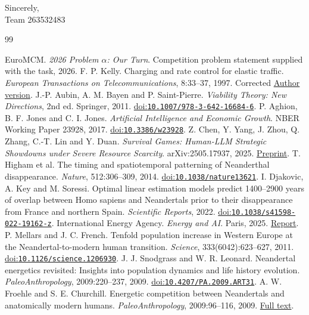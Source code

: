 \documentclass[12pt,a4paper]{article}
\theoremstyle{remark}
\newcommand{\TeamNumber}{263532483} %
\begin{document}
\medskip
Sincerely,\\
Team \TeamNumber

\clearpage
\begin{thebibliography}{99}
\setlength{\itemsep}{0pt}
\setlength{\parsep}{0pt}
\setlength{\parskip}{0pt}
 EuroMCM. \emph{2026 Problem $\alpha$: Our Turn}. Competition problem statement supplied with the task, 2026.
 F. P. Kelly. Charging and rate control for elastic traffic. \emph{European Transactions on Telecommunications}, 8:33--37, 1997. Corrected \href{https://www.statslab.cam.ac.uk/~fpk1/elastic.html}{Author version}.
 J.-P. Aubin, A. M. Bayen and P. Saint-Pierre. \emph{Viability Theory: New Directions}, 2nd ed. Springer, 2011. \href{https://doi.org/10.1007/978-3-642-16684-6}{doi:\nolinkurl{10.1007/978-3-642-16684-6}}.
 P. Aghion, B. F. Jones and C. I. Jones. \emph{Artificial Intelligence and Economic Growth}. NBER Working Paper 23928, 2017. \href{https://doi.org/10.3386/w23928}{doi:\nolinkurl{10.3386/w23928}}.
 Z. Chen, Y. Yang, J. Zhou, Q. Zhang, C.-T. Lin and Y. Duan. \emph{Survival Games: Human-LLM Strategic Showdowns under Severe Resource Scarcity}. arXiv:2505.17937, 2025. \href{https://arxiv.org/abs/2505.17937}{Preprint}.
 T. Higham et al. The timing and spatiotemporal patterning of Neanderthal disappearance. \emph{Nature}, 512:306--309, 2014. \href{https://doi.org/10.1038/nature13621}{doi:\nolinkurl{10.1038/nature13621}}.
 I. Djakovic, A. Key and M. Soressi. Optimal linear estimation models predict 1400--2900 years of overlap between Homo sapiens and Neandertals prior to their disappearance from France and northern Spain. \emph{Scientific Reports}, 2022. \href{https://doi.org/10.1038/s41598-022-19162-z}{doi:\nolinkurl{10.1038/s41598-022-19162-z}}.
 International Energy Agency. \emph{Energy and AI}. Paris, 2025. \href{https://www.iea.org/reports/energy-and-ai/energy-demand-from-ai}{Report}.
 P. Mellars and J. C. French. Tenfold population increase in Western Europe at the Neandertal-to-modern human transition. \emph{Science}, 333(6042):623--627, 2011. \href{https://doi.org/10.1126/science.1206930}{doi:\nolinkurl{10.1126/science.1206930}}.
 J. J. Snodgrass and W. R. Leonard. Neandertal energetics revisited: Insights into population dynamics and life history evolution. \emph{PaleoAnthropology}, 2009:220--237, 2009. \href{https://doi.org/10.4207/PA.2009.ART31}{doi:\nolinkurl{10.4207/PA.2009.ART31}}.
 A. W. Froehle and S. E. Churchill. Energetic competition between Neandertals and anatomically modern humans. \emph{PaleoAnthropology}, 2009:96--116, 2009. \href{https://paleoanthro.org/media/journal/content/PA20090096.pdf}{Full text}.
\end{thebibliography}
\end{document}
